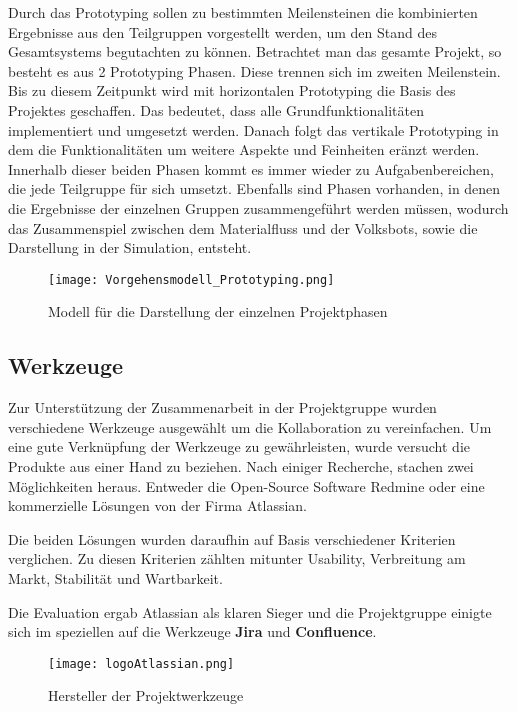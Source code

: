Durch das Prototyping sollen zu bestimmten Meilensteinen die kombinierten Ergebnisse aus den Teilgruppen vorgestellt werden, um den Stand des Gesamtsystems begutachten zu k\"onnen. Betrachtet man das gesamte Projekt, so besteht es aus 2 Prototyping Phasen. Diese trennen sich im zweiten Meilenstein. Bis zu diesem Zeitpunkt wird mit horizontalen Prototyping die Basis des Projektes geschaffen. Das bedeutet, dass alle Grundfunktionalit\"aten implementiert und umgesetzt werden. Danach folgt das vertikale Prototyping in dem die Funktionalit\"aten um weitere Aspekte und Feinheiten er\"anzt werden. Innerhalb dieser beiden Phasen kommt es immer wieder zu Aufgabenbereichen, die jede Teilgruppe f\"ur sich umsetzt. Ebenfalls sind Phasen vorhanden, in denen die Ergebnisse der einzelnen Gruppen zusammengef\"uhrt werden m\"ussen, wodurch das Zusammenspiel zwischen dem Materialfluss und der Volksbots, sowie die Darstellung in der Simulation, entsteht.

	\begin{figure}[h!]
		\centering
			\texttt{[image: Vorgehensmodell\_Prototyping.png]}
			\caption{Modell für die Darstellung der einzelnen Projektphasen}
			\label{Vorgehensmodell_Prototyping}
	\end{figure}	

\subsection{Werkzeuge}	

Zur Unterstützung der Zusammenarbeit in der Projektgruppe wurden verschiedene Werkzeuge ausgewählt um die Kollaboration zu vereinfachen. Um eine gute Verknüpfung der Werkzeuge zu gewährleisten, wurde versucht die Produkte aus einer Hand zu beziehen. Nach einiger Recherche, stachen zwei Möglichkeiten heraus. Entweder die Open-Source Software Redmine oder eine kommerzielle Lösungen von der Firma Atlassian.

Die beiden Lösungen wurden daraufhin auf Basis verschiedener Kriterien verglichen. Zu diesen Kriterien zählten mitunter Usability, Verbreitung am Markt, Stabilität und Wartbarkeit.

Die Evaluation ergab Atlassian als klaren Sieger und die Projektgruppe einigte sich im speziellen auf die Werkzeuge \textbf{Jira} und \textbf{Confluence}. 

\begin{figure}[h!]
		\centering
			\texttt{[image: logoAtlassian.png]}
			\caption{Hersteller der Projektwerkzeuge}
			\label{Vorgehensmodell_Prototyping}
	\end{figure}

